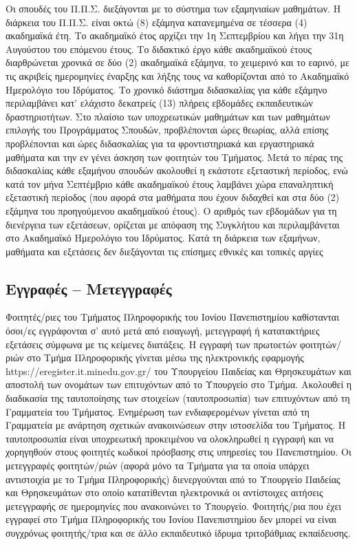 Οι σπουδές του Π.Π.Σ. διεξάγονται με το σύστημα των εξαμηνιαίων
μαθημάτων. Η διάρκεια του Π.Π.Σ. είναι οκτώ (8) εξάμηνα κατανεμημένα σε
τέσσερα (4) ακαδημαϊκά έτη. Το ακαδημαϊκό έτος αρχίζει την 1η
Σεπτεμβρίου και λήγει την 31η Αυγούστου του επόμενου έτους. Το διδακτικό
έργο κάθε ακαδημαϊκού έτους διαρθρώνεται χρονικά σε δύο (2) ακαδημαϊκά
εξάμηνα, το χειμερινό και το εαρινό, με τις ακριβείς ημερομηνίες έναρξης
και λήξης τους να καθορίζονται από το Ακαδημαϊκό Ημερολόγιο του
Ιδρύματος. Το χρονικό διάστημα διδασκαλίας για κάθε εξάμηνο περιλαμβάνει
κατ' ελάχιστο δεκατρείς (13) πλήρεις εβδομάδες εκπαιδευτικών
δραστηριοτήτων. Στο πλαίσιο των υποχρεωτικών μαθημάτων και των μαθημάτων
επιλογής του Προγράμματος Σπουδών, προβλέπονται ώρες θεωρίας, αλλά
επίσης προβλέπονται και ώρες διδασκαλίας για τα φροντιστηριακά και
εργαστηριακά μαθήματα και την εν γένει άσκηση των φοιτητών του Τμήματος.
Μετά το πέρας της διδασκαλίας κάθε εξαμήνου σπουδών ακολουθεί η εκάστοτε
εξεταστική περίοδος, ενώ κατά τον μήνα Σεπτέμβριο κάθε ακαδημαϊκού έτους
λαμβάνει χώρα επαναληπτική εξεταστική περίοδος (που αφορά στα μαθήματα
που έχουν διδαχθεί και στα δύο (2) εξάμηνα του προηγούμενου ακαδημαϊκού
έτους). Ο αριθμός των εβδομάδων για τη διενέργεια των εξετάσεων,
ορίζεται με απόφαση της Συγκλήτου και περιλαμβάνεται στο Ακαδημαϊκό
Ημερολόγιο του Ιδρύματος. Κατά τη διάρκεια των εξαμήνων, μαθήματα και
εξετάσεις δεν διεξάγονται τις επίσημες εθνικές και τοπικές αργίες

\hypertarget{ux3b5ux3b3ux3b3ux3c1ux3b1ux3c6ux3adux3c2-ux3bcux3b5ux3c4ux3b5ux3b3ux3b3ux3c1ux3b1ux3c6ux3adux3c2}{%
\subsection{Εγγραφές --
Μετεγγραφές}\label{ux3b5ux3b3ux3b3ux3c1ux3b1ux3c6ux3adux3c2-ux3bcux3b5ux3c4ux3b5ux3b3ux3b3ux3c1ux3b1ux3c6ux3adux3c2}}

Φοιτητές/ριες του Τμήματος Πληροφορικής του Ιονίου Πανεπιστημίου
καθίστανται όσοι/ες εγγράφονται σ' αυτό μετά από εισαγωγή, μετεγγραφή ή
κατατακτήριες εξετάσεις σύμφωνα με τις κείμενες διατάξεις. Η εγγραφή των
πρωτοετών φοιτητών/ριών στο Τμήμα Πληροφορικής γίνεται μέσω της
ηλεκτρονικής εφαρμογής https://eregister.it.minedu.gov.gr/ του
Υπουργείου Παιδείας και Θρησκευμάτων και αποστολή των ονομάτων των
επιτυχόντων από το Υπουργείο στο Τμήμα. Ακολουθεί η διαδικασία της
ταυτοποίησης των στοιχείων (ταυτοπροσωπία) των επιτυχόντων από τη
Γραμματεία του Τμήματος. Ενημέρωση των ενδιαφερομένων γίνεται από τη
Γραμματεία με ανάρτηση σχετικών ανακοινώσεων στην ιστοσελίδα του
Τμήματος. Η ταυτοπροσωπία είναι υποχρεωτική προκειμένου να ολοκληρωθεί η
εγγραφή και να χορηγηθούν στους φοιτητές κωδικοί πρόσβασης στις
υπηρεσίες του Πανεπιστημίου. Οι μετεγγραφές φοιτητών/ριών (αφορά μόνο τα
Τμήματα για τα οποία υπάρχει αντιστοιχία με το Τμήμα Πληροφορικής)
διενεργούνται από το Υπουργείο Παιδείας και Θρησκευμάτων στο οποίο
κατατίθενται ηλεκτρονικά οι αντίστοιχες αιτήσεις μετεγγραφής σε
ημερομηνίες που ανακοινώνει το Υπουργείο. Φοιτητής/ρια που έχει εγγραφεί
στο Τμήμα Πληροφορικής του Ιονίου Πανεπιστημίου δεν μπορεί να είναι
συγχρόνως φοιτητής/τρια και σε άλλο εκπαιδευτικό ίδρυμα τριτοβάθμιας
εκπαίδευσης.

